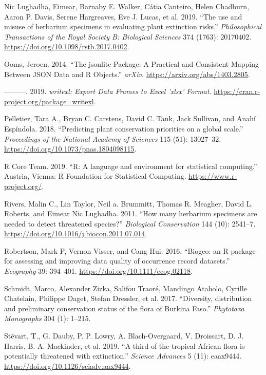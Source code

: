 \documentclass[fleqn,10pt,lineno]{wlpeerj} %
\begin{document}
\leavevmode\hypertarget{ref-NicLughadha2019}{}%
Nic Lughadha, Eimear, Barnaby E. Walker, Cátia Canteiro, Helen Chadburn, Aaron P. Davis, Serene Hargreaves, Eve J. Lucas, et al. 2019. ``The use and misuse of herbarium specimens in evaluating plant extinction risks.'' \emph{Philosophical Transactions of the Royal Society B: Biological Sciences} 374 (1763): 20170402. \url{https://doi.org/10.1098/rstb.2017.0402}.

\leavevmode\hypertarget{ref-Ooms2014}{}%
Ooms, Jeroen. 2014. ``The jsonlite Package: A Practical and Consistent Mapping Between JSON Data and R Objects.'' \emph{arXiv}. \url{https://arxiv.org/abs/1403.2805}.

\leavevmode\hypertarget{ref-Ooms2019}{}%
---------. 2019. \emph{writexl: Export Data Frames to Excel 'xlsx' Format}. \url{https://cran.r-project.org/package=writexl}.

\leavevmode\hypertarget{ref-Pelletier2018}{}%
Pelletier, Tara A., Bryan C. Carstens, David C. Tank, Jack Sullivan, and Anahí Espíndola. 2018. ``Predicting plant conservation priorities on a global scale.'' \emph{Proceedings of the National Academy of Sciences} 115 (51): 13027--32. \url{https://doi.org/10.1073/pnas.1804098115}.

\leavevmode\hypertarget{ref-rcoreteam2019}{}%
R Core Team. 2019. ``R: A language and environment for statistical computing.'' Austria, Vienna: R Foundation for Statistical Computing. \url{https://www.r-project.org/}.

\leavevmode\hypertarget{ref-Rivers2011}{}%
Rivers, Malin C., Lin Taylor, Neil a. Brummitt, Thomas R. Meagher, David L. Roberts, and Eimear Nic Lughadha. 2011. ``How many herbarium specimens are needed to detect threatened species?'' \emph{Biological Conservation} 144 (10): 2541--7. \url{https://doi.org/10.1016/j.biocon.2011.07.014}.

\leavevmode\hypertarget{ref-Robertson2016}{}%
Robertson, Mark P, Vernon Visser, and Cang Hui. 2016. ``Biogeo: an R package for assessing and improving data quality of occurrence record datasets.'' \emph{Ecography} 39: 394--401. \url{https://doi.org/10.1111/ecog.02118}.

\leavevmode\hypertarget{ref-Schmidt2017}{}%
Schmidt, Marco, Alexander Zizka, Salifou Traoré, Mandingo Ataholo, Cyrille Chatelain, Philippe Daget, Stefan Dressler, et al. 2017. ``Diversity, distribution and preliminary conservation status of the flora of Burkina Faso.'' \emph{Phytotaxa Monographs} 304 (1): 1--215.

\leavevmode\hypertarget{ref-Stevart2019}{}%
Stévart, T., G. Dauby, P. P. Lowry, A. Blach-Overgaard, V. Droissart, D. J. Harris, B. A. Mackinder, et al. 2019. ``A third of the tropical African flora is potentially threatened with extinction.'' \emph{Science Advances} 5 (11): eaax9444. \url{https://doi.org/10.1126/sciadv.aax9444}.
\end{document}
